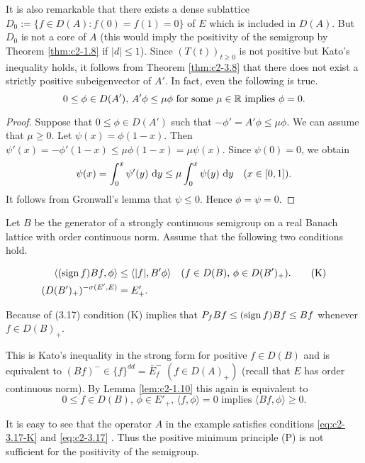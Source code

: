 It is also remarkable that there exists a dense sublattice
$D_{0} := \{f \in D(A) : f(0) = f(1) = 0\}$ of $E$ which is included in $D(A)$.
But $D_{0}$ is not a core of $A$ (this would imply the positivity of the semigroup by Theorem \ref{thm:c2-1.8}   if $|d| \leq 1$).
Since $(T(t))_{t \geq 0}$ is not positive but Kato's inequality holds, it
follows from Theorem \ref{thm:c2-3.8}   that there does not exist a strictly positive subeigenvector of $A'$. 
In fact, even the following is true.
\begin{equation} \label{eq:c2-3.16} 
0 \leq \phi \in D(A'), \, A'\phi \leq \mu\phi \text{ for some } \mu \in \mathbb{R} \text{ implies } \phi = 0.
\end{equation}

\begin{proof}
Suppose that $0 \leq \phi \in D(A')$ such that $-\phi' = A'\phi \leq \mu\phi$. 
We can assume that $\mu \geq 0$. 
Let $\psi(x) = \phi(1-x)$. 
Then $\psi'(x) = -\phi'(1-x) \leq \mu\phi(1-x) = \mu\psi(x)$. 
Since $\psi(0) = 0$, we obtain
\begin{equation*} \label{eq:c2-3-KGK} 
\psi(x) = \int_{0}^{x} \psi'(y) \, \mathop{}\!\mathrm{d}{y} \leq \mu \int_{0}^{x} \psi(y) \, \mathop{}\!\mathrm{d}{y} \quad (x \in [0,1]).
\end{equation*}
It follows from Gronwall's lemma that $\psi \leq 0$. Hence $\phi = \psi = 0$.
\end{proof}

\begin{remark}\label{rem:c2-3.16}
Let $B$ be the generator of a strongly continuous semigroup on a real Banach lattice with order continuous norm. Assume that the following two conditions hold.

\begin{align}
\langle(\operatorname{sign}  f)Bf,\phi\rangle &\leq \langle|f|,B'\phi\rangle \quad (f \in D(B), \, \phi \in D(B')_{+}). \label{eq:c2-3.17-K} \tag{K}\\
(D(B')_{+})^{-\sigma(E',E)} &= E'_{+}. \label{eq:c2-3.17}
\end{align}

Because of (3.17) condition (K) implies that $P_{f}Bf \leq (\operatorname{sign}  f)Bf \leq Bf$
whenever $f \in D(B)_{+}$.

This is Kato's inequality in the strong form for positive $f \in D(B)$ and is equivalent to $(Bf)^{-} \in \{f\}^{dd} = \overline{E}_{f}^{-}$ $(f \in D(A)_{+})$ 
(recall that $E$ has order continuous norm). By Lemma 
\ref{lem:c2-1.10}  this again is equivalent to
\begin{equation}\label{eq:c2-P2} \tag{P}
0 \leq f \in D(B), \, \phi \in E'_{+}, \, \langle f,\phi \rangle = 0 \text{ implies } \langle Bf,\phi \rangle \geq 0.
\end{equation}

It is easy to see that the operator $A$ in the example satisfies conditions \eqref{eq:c2-3.17-K}  and \eqref{eq:c2-3.17}  . Thus the positive minimum principle (P) is not sufficient for the positivity of the semigroup.
\end{remark}

